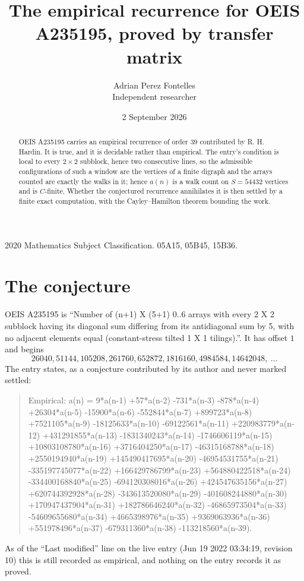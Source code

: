\documentclass[11pt,a4paper]{article}
\title{The empirical recurrence for OEIS A235195, proved by transfer matrix}
\author{Adrian Perez Fontelles\\ \small Independent researcher}
\date{2 September 2026}
\theoremstyle{plain}
\theoremstyle{definition}
\begin{document}
\maketitle

\begin{abstract}
OEIS A235195 carries an empirical recurrence of order $39$ contributed by R. H. Hardin. It is
true, and it is decidable rather than empirical. The entry's condition is local to every $2\times2$ subblock, hence two consecutive lines, so
the admissible configurations of such a window are the vertices of a finite digraph and the
arrays counted are exactly the walks in it; hence $a(n)$ is a walk count on $S=54432$ vertices
and is $C$-finite. Whether the conjectured recurrence annihilates it is then settled by a
finite exact computation, with the Cayley--Hamilton theorem bounding the work.
\end{abstract}

\noindent\small 2020 Mathematics Subject Classification. 05A15, 05B45, 15B36.\normalsize

\section{The conjecture}

OEIS A235195 is ``Number of (n+1) X (5+1) 0..6 arrays with every 2 X 2 subblock having its diagonal sum differing from its antidiagonal sum by 5, with no adjacent elements equal (constant-stress tilted 1 X 1 tilings).''. It has offset $1$ and begins
\[
26040, 51144, 105208, 261760, 652872, 1816160, 4984584, 14642048,\ \dots
\]
The entry states, as a conjecture contributed by its author and never marked settled:
\begin{quote}
Empirical: a(n) = 9*a(n-1) +57*a(n-2) -731*a(n-3) -878*a(n-4) +26304*a(n-5) -15900*a(n-6) -552844*a(n-7) +899723*a(n-8) +7521105*a(n-9) -18125633*a(n-10) -69122561*a(n-11) +220983779*a(n-12) +431291855*a(n-13) -1831340243*a(n-14) -1746606119*a(n-15) +10803108780*a(n-16) +3716404250*a(n-17) -46315168788*a(n-18) +2550194940*a(n-19) +145490417695*a(n-20) -46954531755*a(n-21) -335197745077*a(n-22) +166429786799*a(n-23) +564880422518*a(n-24) -334400168840*a(n-25) -694120308016*a(n-26) +424547635156*a(n-27) +620744392928*a(n-28) -343613520080*a(n-29) -401608244880*a(n-30) +170947437904*a(n-31) +182786646240*a(n-32) -46865973504*a(n-33) -54609655680*a(n-34) +4665398976*a(n-35) +9369063936*a(n-36) +551978496*a(n-37) -679311360*a(n-38) -113218560*a(n-39).
\end{quote}
As of the ``Last modified'' line on the live entry (Jun 19 2022 03:34:19, revision 10) this is still
recorded as empirical, and nothing on the entry records it as proved.
\end{document}
